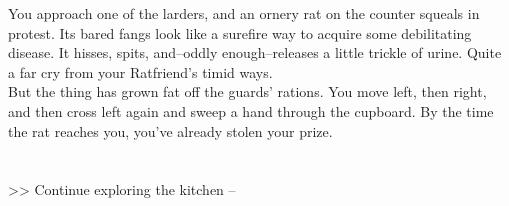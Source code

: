 You approach one of the larders, and an ornery rat on the counter squeals in protest. Its bared fangs look like a surefire way to acquire some debilitating disease. It hisses, spits, and--oddly enough--releases a little trickle of urine. Quite a far cry from your Ratfriend’s timid ways.\\

But the thing has grown fat off the guards’ rations. You move left, then right, and then cross left again and sweep a hand through the cupboard. By the time the rat reaches you, you’ve already stolen your prize.\\
\\
\\

>> Continue exploring the kitchen -- 